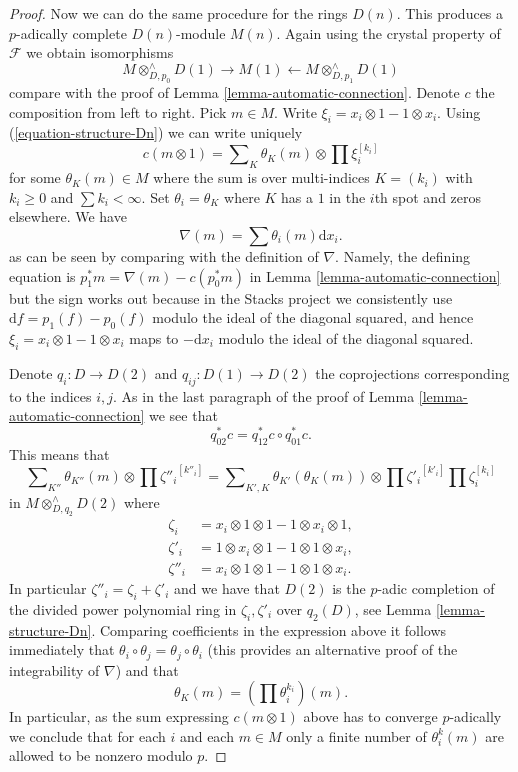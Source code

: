 \begin{proof}
\medskip\noindent
Now we can do the same procedure for the rings $D(n)$.
This produces a $p$-adically complete $D(n)$-module $M(n)$. Again using
the crystal property of $\mathcal{F}$ we obtain isomorphisms
$$
M \otimes^\wedge_{D, p_0} D(1) \rightarrow M(1)
\leftarrow M \otimes^\wedge_{D, p_1} D(1)
$$
compare with the proof of Lemma \ref{lemma-automatic-connection}.
Denote $c$ the composition from left to right. Pick $m \in M$.
Write $\xi_i = x_i \otimes 1 - 1 \otimes x_i$.
Using (\ref{equation-structure-Dn}) we can write uniquely
$$
c(m \otimes 1) = \sum\nolimits_K \theta_K(m) \otimes \prod \xi_i^{[k_i]}
$$
for some $\theta_K(m) \in M$ where the sum is over multi-indices
$K = (k_i)$ with $k_i \geq 0$ and $\sum k_i < \infty$. Set
$\theta_i = \theta_K$ where $K$ has a $1$ in the $i$th spot and
zeros elsewhere. We have
$$
\nabla(m) = \sum \theta_i(m) \text{d}x_i.
$$
as can be seen by comparing with the definition of
$\nabla$. Namely, the defining equation is
$p_1^*m = \nabla(m) - c(p_0^*m)$ in Lemma \ref{lemma-automatic-connection}
but the sign works out because in the Stacks project we consistently use
$\text{d}f = p_1(f) - p_0(f)$ modulo the ideal of the diagonal squared,
and hence $\xi_i = x_i \otimes 1 - 1 \otimes x_i$ maps to $-\text{d}x_i$
modulo the ideal of the diagonal squared.

\medskip\noindent
Denote $q_i : D \to D(2)$ and $q_{ij} : D(1) \to D(2)$ the coprojections
corresponding to the indices $i, j$. As in the last paragraph of the proof of
Lemma \ref{lemma-automatic-connection}
we see that
$$
q_{02}^*c = q_{12}^*c \circ q_{01}^*c.
$$
This means that
$$
\sum\nolimits_{K''} \theta_{K''}(m) \otimes \prod {\zeta''_i}^{[k''_i]}
=
\sum\nolimits_{K', K} \theta_{K'}(\theta_K(m))
\otimes \prod {\zeta'_i}^{[k'_i]} \prod \zeta_i^{[k_i]}
$$
in $M \otimes^\wedge_{D, q_2} D(2)$ where
\begin{align*}
\zeta_i & = x_i \otimes 1 \otimes 1 - 1 \otimes x_i \otimes 1,\\
\zeta'_i & = 1 \otimes x_i \otimes 1 - 1 \otimes 1 \otimes x_i,\\
\zeta''_i & = x_i \otimes 1 \otimes 1 - 1 \otimes 1 \otimes x_i.
\end{align*}
In particular $\zeta''_i = \zeta_i + \zeta'_i$ and we have that
$D(2)$ is the $p$-adic completion of the divided power polynomial
ring in $\zeta_i, \zeta'_i$ over $q_2(D)$, see Lemma \ref{lemma-structure-Dn}.
Comparing coefficients in the expression above it follows immediately that
$\theta_i \circ \theta_j = \theta_j \circ \theta_i$
(this provides an alternative proof of the integrability of $\nabla$) and that
$$
\theta_K(m) = (\prod \theta_i^{k_i})(m).
$$
In particular, as the sum expressing $c(m \otimes 1)$ above has to converge
$p$-adically we conclude that for each $i$ and each $m \in M$ only a finite
number of $\theta_i^k(m)$ are allowed to be nonzero modulo $p$.
\end{proof}